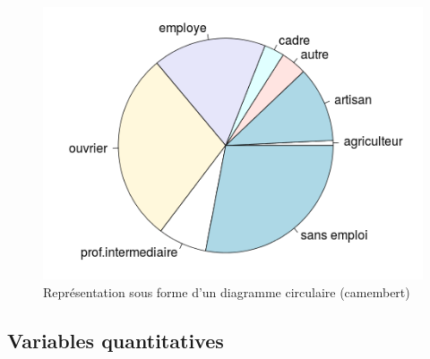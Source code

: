 \begin{figure}[H]\begin{center}\includegraphics[scale=0.5]{ilu/tp2.png}\caption{Représentation sous forme d'un diagramme circulaire (camembert)}\end{center}\end{figure}
\subsection{Variables quantitatives}

